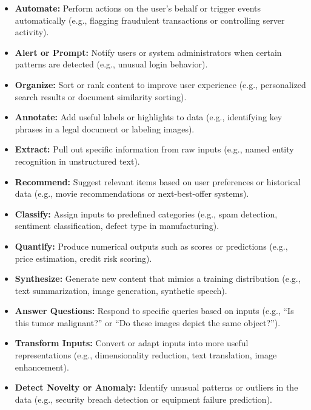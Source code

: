 \documentclass[12pt,openany]{book}
\begin{document}
\begin{itemize}
    \item \textbf{Automate:} Perform actions on the user's behalf or trigger events automatically (e.g., flagging fraudulent transactions or controlling server activity).
    
    \item \textbf{Alert or Prompt:} Notify users or system administrators when certain patterns are detected (e.g., unusual login behavior).
    
    \item \textbf{Organize:} Sort or rank content to improve user experience (e.g., personalized search results or document similarity sorting).
    
    \item \textbf{Annotate:} Add useful labels or highlights to data (e.g., identifying key phrases in a legal document or labeling images).
    
    \item \textbf{Extract:} Pull out specific information from raw inputs (e.g., named entity recognition in unstructured text).
    
    \item \textbf{Recommend:} Suggest relevant items based on user preferences or historical data (e.g., movie recommendations or next-best-offer systems).
    
    \item \textbf{Classify:} Assign inputs to predefined categories (e.g., spam detection, sentiment classification, defect type in manufacturing).
    
    \item \textbf{Quantify:} Produce numerical outputs such as scores or predictions (e.g., price estimation, credit risk scoring).
    
    \item \textbf{Synthesize:} Generate new content that mimics a training distribution (e.g., text summarization, image generation, synthetic speech).
    
    \item \textbf{Answer Questions:} Respond to specific queries based on inputs (e.g., “Is this tumor malignant?” or “Do these images depict the same object?”).
    
    \item \textbf{Transform Inputs:} Convert or adapt inputs into more useful representations (e.g., dimensionality reduction, text translation, image enhancement).
    
    \item \textbf{Detect Novelty or Anomaly:} Identify unusual patterns or outliers in the data (e.g., security breach detection or equipment failure prediction).
\end{itemize}
\end{document}
